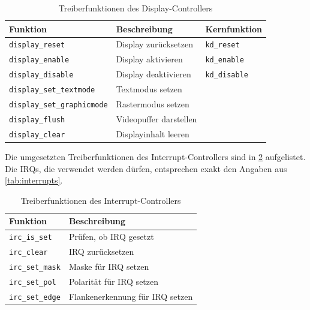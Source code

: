 \begin{table}[!htbp]
	\bigskip
	\centering
	\begin{tabular}{ l | l | l }
		\textbf{Funktion} & \textbf{Beschreibung} & \textbf{Kernfunktion} \\
		\hline		
		\texttt{display\_reset} & Display zurücksetzen & \texttt{kd\_reset} \\
		\texttt{display\_enable} & Display aktivieren & \texttt{kd\_enable} \\
		\texttt{display\_disable} & Display deaktivieren & \texttt{kd\_disable}\\
		\texttt{display\_set\_textmode} & Textmodus setzen & \\
		\texttt{display\_set\_graphicmode} & Rastermodus setzen & \\
		\texttt{display\_flush} & Videopuffer darstellen & \\
		\texttt{display\_clear} & Displayinhalt leeren & \\
		\hline
	\end{tabular}
	
	\caption{Treiberfunktionen des Display-Controllers}
	\label{tab:drv_display_func}
\end{table}


Die umgesetzten Treiberfunktionen des Interrupt-Controllers sind in \cref{tab:drv_irc_func} aufgelistet. Die \glspl{IRQ}, die verwendet werden dürfen, entsprechen exakt den Angaben aus \cref{tab:interrupts}.

\begin{table}[!htbp]
	\bigskip
	\centering
	\begin{tabular}{ l | l }
		\textbf{Funktion} & \textbf{Beschreibung} \\
		\hline		
		\texttt{irc\_is\_set} & Prüfen, ob \gls{IRQ} gesetzt \\
		\texttt{irc\_clear} & \gls{IRQ} zurücksetzen \\
		\texttt{irc\_set\_mask} & Maske für \gls{IRQ} setzen \\
		\texttt{irc\_set\_pol} & Polarität für \gls{IRQ} setzen \\
		\texttt{irc\_set\_edge} & Flankenerkennung für \gls{IRQ} setzen \\
		\hline
	\end{tabular}
	
	\caption{Treiberfunktionen des Interrupt-Controllers}
	\label{tab:drv_irc_func}
\end{table}

